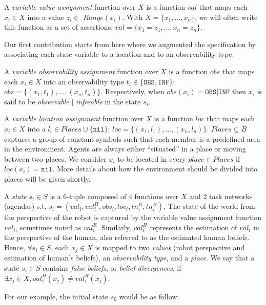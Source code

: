 A \textit{variable value assignment} function over $X$ is a function $val$ that maps each $x_i \in X$ into a value $z_i \in$ $\textit{Range}(x_i)$. With $X = \{ x_1, ..., x_n \}$, we will often write this function as a set of assertions: $val = \{ x_1=z_1, \ldots, x_n=z_n \}$. 

Our first contribution starts from here where we augmented the specification by associating each state variable to a location and to an observability type.

A \textit{variable observability assignment} function over $X$ is a function $obs$ that maps each $x_i \in X$ into an observability type $t_i \in \{ \texttt{OBS},  \texttt{INF} \}$: $obs = \{ (x_1,t_1), \ldots , (x_n,t_n) \}$. Respectively, when $obs(x_i) = \texttt{OBS} | \texttt{INF}$ then $x_i$ is said to be \textit{observable} $|$ \textit{inferable} in the state $s_i$.

A \textit{variable location assignment} function over $X$ is a function $loc$ that maps each $x_i \in X$ into a $l_i \in Places \cup \{ \texttt{nil} \}$: $loc = \{ (x_1,l_1), ..., (x_n,l_n) \}$. 
$Places \subseteq B$ captures a group of constant symbols such that each member is a predefined area in the environment. 
Agents are always either ``situated'' in a place or moving between two places. 
We consider $x_i$ to be located in every $place \in Places$ if $loc(x_i)=\texttt{nil}$. 
More details about how the environment should be divided into places will be given shortly.

A \textit{state} $s_i \in S$ is a 6-tuple composed of 4 functions over $X$ and 2 task networks (agendas)  s.t. $s_i = (val_i, val^H_i, obs_i, loc_i, tn^R_i, tn^H_i)$. 
The state of the world from the perspective of the robot is captured by the variable value assignment function $val_i$, sometimes noted as $val^R_i$. 
Similarly, $val^H_i$ represents the estimation of $val_i$ in the perspective of the human, also referred to as the estimated human beliefs. 
Hence, $\forall s_i \in S$, each $x_j \in X$ is  mapped to two \textit{values} (robot perspective and estimation of human's beliefs), an \textit{observability type}, and a \textit{place}. We say that a state $s_i \in S$ contains \textit{false beliefs}, or \textit{belief divergences}, if $\exists x_j \in X, val^H_i(x_j) \neq val^R_i(x_j)$. 

For our example, the initial state $s_0$ would be as follow: 

